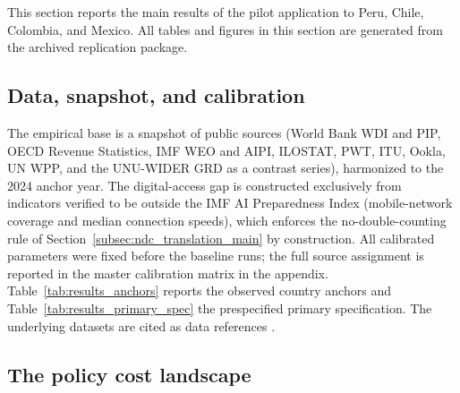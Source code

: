 \documentclass[11pt,a4paper]{article}
\begin{document}
This section reports the main results of the pilot application to Peru, Chile, Colombia,
and Mexico. All tables and figures in this section are generated from the archived replication package.

\subsection{Data, snapshot, and calibration}\label{subsec:results_data}

The empirical base is a snapshot of public sources (World Bank WDI and
PIP, OECD Revenue Statistics, IMF WEO and AIPI, ILOSTAT, PWT, ITU, Ookla, UN WPP, and the
UNU-WIDER GRD as a contrast series), harmonized to the 2024 anchor year. The digital-access
gap is constructed exclusively from indicators verified to be outside the IMF AI Preparedness
Index (mobile-network coverage and median connection speeds), which enforces the
no-double-counting rule of Section~\ref{subsec:ndc_translation_main} by construction. All
calibrated parameters were fixed before the baseline runs; the full source assignment is reported in the master calibration matrix in the
appendix. Table~\ref{tab:results_anchors} reports the observed country anchors and
Table~\ref{tab:results_primary_spec} the prespecified primary specification.
The underlying datasets are cited as data references \citep{unu2025grd,unwpp2024,pwt1001,worldbank2026pip,worldbank2026wdi,inei2024enaho,mdsf2024casen,ookla2024speedtest}.




\subsection{The policy cost landscape}\label{subsec:results_costs}
\end{document}
